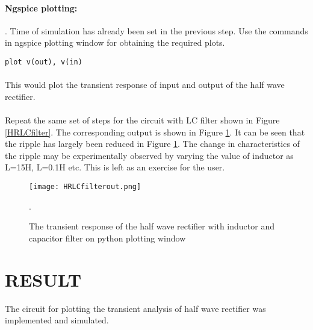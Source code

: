 \paragraph{Ngspice plotting:}. Time of simulation has already been set in the previous step. Use the commands in ngspice plotting window for obtaining the required plots.

\texttt{plot v(out), v(in) }

\paragraph{}

This would plot the transient response of input and output of the half wave rectifier. 

\paragraph{}Repeat the same set of steps for the circuit with LC filter shown in Figure \ref{HRLCfilter}. The corresponding output is shown in Figure \ref{HRLCfilterout}.  It can be seen that the ripple has largely been reduced in Figure \ref{HRLCfilterout}. The change in characteristics of the ripple may be experimentally observed by varying the value of inductor as L=15H, L=0.1H etc. This is left as an exercise for the user.

\begin{figure}[h]
\centering
\texttt{[image: HRLCfilterout.png]}
\caption{The transient response of the half wave rectifier with inductor and capacitor filter on python plotting window}
\label{HRLCfilterout}.
\end{figure}

\section*{RESULT}
The circuit for plotting the transient analysis of half wave rectifier was implemented and simulated.


